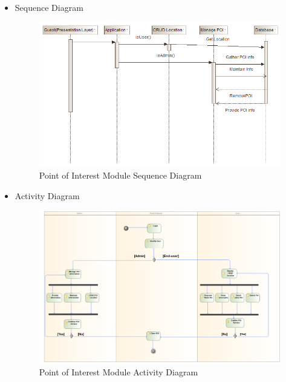 \documentclass{article}
\begin{document}
\begin{itemize}
			\item Sequence Diagram
			\begin{center}
				\begin{figure}[!h]
					\includegraphics[scale=0.6]{POI_Sequence_diagram.png}
					\caption{Point of Interest Module Sequence Diagram}
				\end{figure}
			\end{center}
			\pagebreak
			
				\item Activity Diagram
 				\begin{center}
 					\begin{figure}[!h]
 						\includegraphics[angle=90, scale=0.375]{POI_Activity_Diagram.png}
 						\caption{Point of Interest Module Activity Diagram}
 					\end{figure}
 				\end{center}
 				\pagebreak
 				

\end{itemize}
\end{document}
